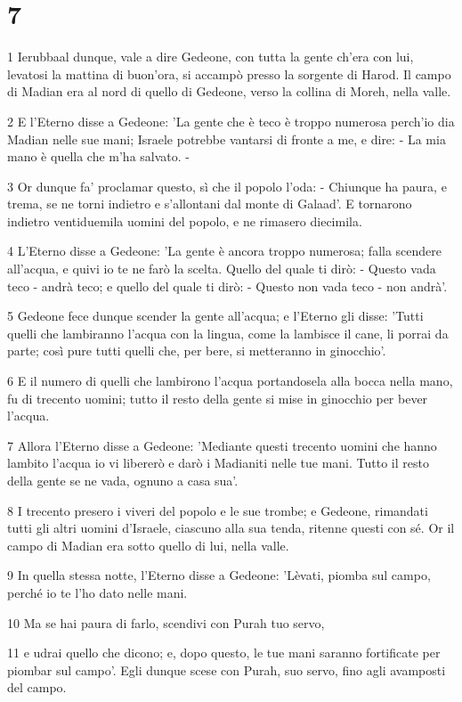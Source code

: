 \chapter{7}

\par 1 Ierubbaal dunque, vale a dire Gedeone, con tutta la gente ch'era con lui, levatosi la mattina di buon'ora, si accampò presso la sorgente di Harod. Il campo di Madian era al nord di quello di Gedeone, verso la collina di Moreh, nella valle.
\par 2 E l'Eterno disse a Gedeone: 'La gente che è teco è troppo numerosa perch'io dia Madian nelle sue mani; Israele potrebbe vantarsi di fronte a me, e dire: - La mia mano è quella che m'ha salvato. -
\par 3 Or dunque fa' proclamar questo, sì che il popolo l'oda: - Chiunque ha paura, e trema, se ne torni indietro e s'allontani dal monte di Galaad'. E tornarono indietro ventiduemila uomini del popolo, e ne rimasero diecimila.
\par 4 L'Eterno disse a Gedeone: 'La gente è ancora troppo numerosa; falla scendere all'acqua, e quivi io te ne farò la scelta. Quello del quale ti dirò: - Questo vada teco - andrà teco; e quello del quale ti dirò: - Questo non vada teco - non andrà'.
\par 5 Gedeone fece dunque scender la gente all'acqua; e l'Eterno gli disse: 'Tutti quelli che lambiranno l'acqua con la lingua, come la lambisce il cane, li porrai da parte; così pure tutti quelli che, per bere, si metteranno in ginocchio'.
\par 6 E il numero di quelli che lambirono l'acqua portandosela alla bocca nella mano, fu di trecento uomini; tutto il resto della gente si mise in ginocchio per bever l'acqua.
\par 7 Allora l'Eterno disse a Gedeone: 'Mediante questi trecento uomini che hanno lambito l'acqua io vi libererò e darò i Madianiti nelle tue mani. Tutto il resto della gente se ne vada, ognuno a casa sua'.
\par 8 I trecento presero i viveri del popolo e le sue trombe; e Gedeone, rimandati tutti gli altri uomini d'Israele, ciascuno alla sua tenda, ritenne questi con sé. Or il campo di Madian era sotto quello di lui, nella valle.
\par 9 In quella stessa notte, l'Eterno disse a Gedeone: 'Lèvati, piomba sul campo, perché io te l'ho dato nelle mani.
\par 10 Ma se hai paura di farlo, scendivi con Purah tuo servo,
\par 11 e udrai quello che dicono; e, dopo questo, le tue mani saranno fortificate per piombar sul campo'. Egli dunque scese con Purah, suo servo, fino agli avamposti del campo.

